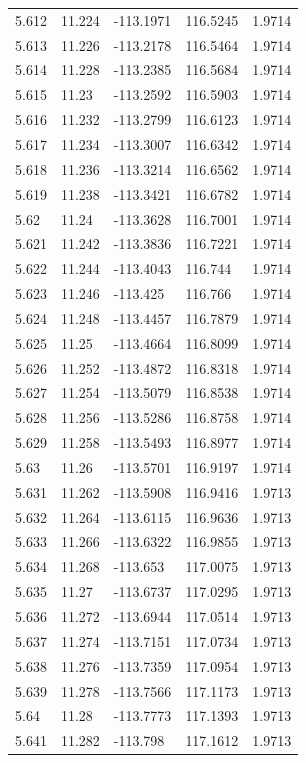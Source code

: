 \begin{tabular}{lllll}
5.612 & 11.224 & -113.1971 & 116.5245 & 1.9714 \\
5.613 & 11.226 & -113.2178 & 116.5464 & 1.9714 \\
5.614 & 11.228 & -113.2385 & 116.5684 & 1.9714 \\
5.615 & 11.23 & -113.2592 & 116.5903 & 1.9714 \\
5.616 & 11.232 & -113.2799 & 116.6123 & 1.9714 \\
5.617 & 11.234 & -113.3007 & 116.6342 & 1.9714 \\
5.618 & 11.236 & -113.3214 & 116.6562 & 1.9714 \\
5.619 & 11.238 & -113.3421 & 116.6782 & 1.9714 \\
5.62 & 11.24 & -113.3628 & 116.7001 & 1.9714 \\
5.621 & 11.242 & -113.3836 & 116.7221 & 1.9714 \\
5.622 & 11.244 & -113.4043 & 116.744 & 1.9714 \\
5.623 & 11.246 & -113.425 & 116.766 & 1.9714 \\
5.624 & 11.248 & -113.4457 & 116.7879 & 1.9714 \\
5.625 & 11.25 & -113.4664 & 116.8099 & 1.9714 \\
5.626 & 11.252 & -113.4872 & 116.8318 & 1.9714 \\
5.627 & 11.254 & -113.5079 & 116.8538 & 1.9714 \\
5.628 & 11.256 & -113.5286 & 116.8758 & 1.9714 \\
5.629 & 11.258 & -113.5493 & 116.8977 & 1.9714 \\
5.63 & 11.26 & -113.5701 & 116.9197 & 1.9714 \\
5.631 & 11.262 & -113.5908 & 116.9416 & 1.9713 \\
5.632 & 11.264 & -113.6115 & 116.9636 & 1.9713 \\
5.633 & 11.266 & -113.6322 & 116.9855 & 1.9713 \\
5.634 & 11.268 & -113.653 & 117.0075 & 1.9713 \\
5.635 & 11.27 & -113.6737 & 117.0295 & 1.9713 \\
5.636 & 11.272 & -113.6944 & 117.0514 & 1.9713 \\
5.637 & 11.274 & -113.7151 & 117.0734 & 1.9713 \\
5.638 & 11.276 & -113.7359 & 117.0954 & 1.9713 \\
5.639 & 11.278 & -113.7566 & 117.1173 & 1.9713 \\
5.64 & 11.28 & -113.7773 & 117.1393 & 1.9713 \\
5.641 & 11.282 & -113.798 & 117.1612 & 1.9713 \\

\end{tabular}
